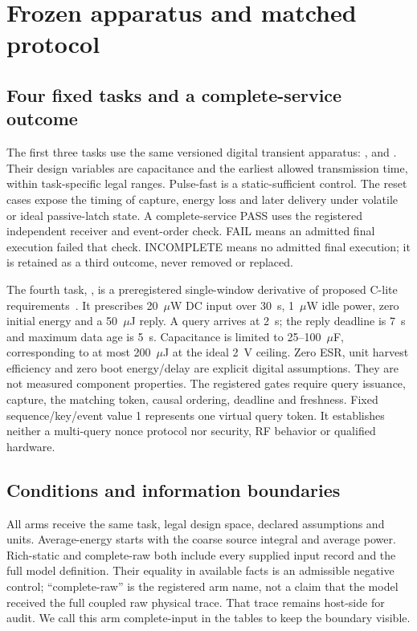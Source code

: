\section{Frozen apparatus and matched protocol}
\subsection{Four fixed tasks and a complete-service outcome}
The first three tasks use the same versioned digital transient apparatus:
,  and .
Their design variables are capacitance and the earliest allowed transmission
time, within task-specific legal ranges. Pulse-fast is a static-sufficient
control. The reset cases expose the timing of capture, energy loss and later
delivery under volatile or ideal passive-latch state. A complete-service PASS
uses the registered independent receiver and event-order check. FAIL means an
admitted final execution failed that check. INCOMPLETE means no admitted final
execution; it is retained as a third outcome, never removed or replaced.

The fourth task, , is a preregistered
single-window derivative of proposed C-lite requirements~\cite{interfaces}.
It prescribes 20~$\mu$W DC input over 30~s, 1~$\mu$W idle power,
zero initial energy and a 50~$\mu$J reply. A query arrives at 2~s;
the reply deadline is 7~s and maximum data age is 5~s. Capacitance is limited
to 25--100~$\mu$F, corresponding to at most 200~$\mu$J at the ideal
2~V ceiling. Zero ESR, unit harvest efficiency and zero boot energy/delay
are explicit digital assumptions. They are not measured component properties.
The registered gates require query issuance, capture, the matching token,
causal ordering, deadline and freshness. Fixed sequence/key/event value 1
represents one virtual query token. It establishes neither a multi-query nonce
protocol nor security, RF behavior or qualified hardware.

\subsection{Conditions and information boundaries}
All arms receive the same task, legal design space, declared assumptions and
units. Average-energy starts with the coarse source integral and average power.
Rich-static and complete-raw both include every supplied input record and the
full model definition. Their equality in available facts is an admissible
negative control; ``complete-raw'' is the registered arm name, not a claim
that the model received the full coupled raw physical trace. That trace remains
host-side for audit. We call this arm complete-input in the tables to keep
the boundary visible.

